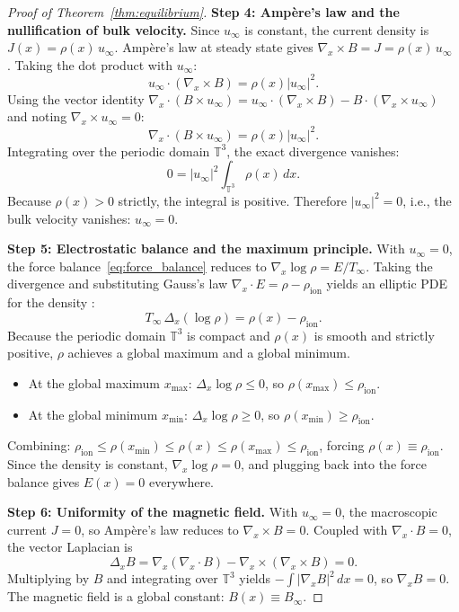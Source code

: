 \documentclass[]{article}
\numberwithin{equation}{section}
\begin{document}
\begin{proof}[Proof of Theorem~\ref{thm:equilibrium}]
\textbf{Step 4: Amp\`ere's law and the nullification of bulk velocity.}
Since $u_\infty$ is constant, the current density is $J(x) = \rho(x) \, u_\infty$.  Amp\`ere's law at steady state gives $\nabla_x \times B = J = \rho(x) \, u_\infty$ \citep[cf.][Eqs.~60--62]{guo2003vlasov}.  Taking the dot product with $u_\infty$:
\[
u_\infty \cdot (\nabla_x \times B) = \rho(x) |u_\infty|^2.
\]
Using the vector identity $\nabla_x \cdot (B \times u_\infty) = u_\infty \cdot (\nabla_x \times B) - B \cdot (\nabla_x \times u_\infty)$ and noting $\nabla_x \times u_\infty = 0$:
\[
\nabla_x \cdot (B \times u_\infty) = \rho(x)|u_\infty|^2.
\]
Integrating over the periodic domain $\mathbb{T}^3$, the exact divergence vanishes:
\[
0 = |u_\infty|^2 \int_{\mathbb{T}^3} \rho(x) \, dx.
\]
Because $\rho(x) > 0$ strictly, the integral is positive.  Therefore $|u_\infty|^2 = 0$, i.e., the bulk velocity vanishes: $u_\infty = 0$.

\textbf{Step 5: Electrostatic balance and the maximum principle.}
With $u_\infty = 0$, the force balance~\eqref{eq:force_balance} reduces to $\nabla_x \log \rho = E / T_\infty$.  Taking the divergence and substituting Gauss's law $\nabla_x \cdot E = \rho - \rho_{\mathrm{ion}}$ yields an elliptic PDE for the density \citep[cf.][Eq.~142]{guo2012vlasov}:
\begin{equation}
\label{eq:poisson_boltzmann}
T_\infty \, \Delta_x (\log \rho) = \rho(x) - \rho_{\mathrm{ion}}.
\end{equation}
Because the periodic domain $\mathbb{T}^3$ is compact and $\rho(x)$ is smooth and strictly positive, $\rho$ achieves a global maximum and a global minimum.
\begin{itemize}
\item At the global maximum $x_{\max}$: $\Delta_x \log \rho \leq 0$, so $\rho(x_{\max}) \leq \rho_{\mathrm{ion}}$.
\item At the global minimum $x_{\min}$: $\Delta_x \log \rho \geq 0$, so $\rho(x_{\min}) \geq \rho_{\mathrm{ion}}$.
\end{itemize}
Combining: $\rho_{\mathrm{ion}} \leq \rho(x_{\min}) \leq \rho(x) \leq \rho(x_{\max}) \leq \rho_{\mathrm{ion}}$, forcing $\rho(x) \equiv \rho_{\mathrm{ion}}$.  Since the density is constant, $\nabla_x \log \rho = 0$, and plugging back into the force balance gives $E(x) = 0$ everywhere.

\textbf{Step 6: Uniformity of the magnetic field.}
With $u_\infty = 0$, the macroscopic current $J = 0$, so Amp\`ere's law reduces to $\nabla_x \times B = 0$.  Coupled with $\nabla_x \cdot B = 0$, the vector Laplacian is
\[
\Delta_x B = \nabla_x(\nabla_x \cdot B) - \nabla_x \times (\nabla_x \times B) = 0.
\]
Multiplying by $B$ and integrating over $\mathbb{T}^3$ yields $-\int |\nabla_x B|^2 \, dx = 0$, so $\nabla_x B = 0$.  The magnetic field is a global constant: $B(x) \equiv B_\infty$.


\end{proof}
\end{document}
